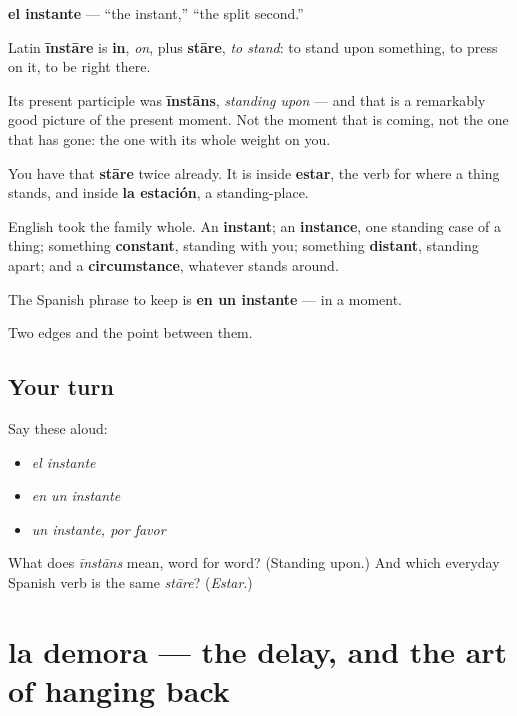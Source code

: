 \begin{cousinweb}
\textbf{el instante} — \textquotedblleft{}the instant,\textquotedblright{} \textquotedblleft{}the split second.\textquotedblright{}

Latin \textbf{īnstāre} is \textbf{in}, \emph{on}, plus \textbf{stāre}, \emph{to stand}: to stand upon something, to press on it, to be right there.

Its present participle was \textbf{īnstāns}, \emph{standing upon} — and that is a remarkably good picture of the present moment. Not the moment that is coming, not the one that has gone: the one with its whole weight on you.

You have that \textbf{stāre} twice already. It is inside \textbf{estar}, the verb for where a thing stands, and inside \textbf{la estación}, a standing-place.

English took the family whole. An \textbf{instant}; an \textbf{instance}, one standing case of a thing; something \textbf{constant}, standing with you; something \textbf{distant}, standing apart; and a \textbf{circumstance}, whatever stands around.

The Spanish phrase to keep is \textbf{en un instante} — in a moment.
\end{cousinweb}

\begin{grammarlens}[title={What you've built}]
Two edges and the point between them.
\end{grammarlens}

\subsection*{Your turn}
Say these aloud:

\begin{itemize}
\raggedright
  \item \emph{el instante}
  \item \emph{en un instante}
  \item \emph{un instante, por favor}
\end{itemize}

\begin{tcolorbox}[breakable,colback=teal!4,colframe=teal!35!black,title={Before you move on}]
What does \emph{īnstāns} mean, word for word? (Standing upon.) And which everyday Spanish verb is the same \emph{stāre}? (\emph{Estar}.)
\end{tcolorbox}
\section[la demora]{la demora — the delay, and the art of hanging back}


